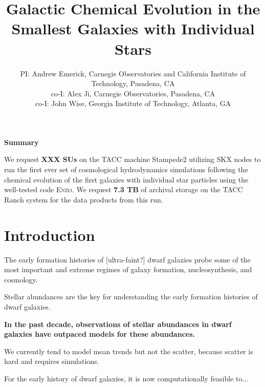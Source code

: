 \documentclass[12pt]{article} %
\title{\vspace{-5ex} \Large Galactic Chemical Evolution in the Smallest Galaxies with Individual Stars
       \vspace{-2ex}}
\author{\small PI: Andrew Emerick, Carnegie Observatories and California Institute of Technology, Pasadena, CA \\
\small co-I: Alex Ji, Carnegie Observatories, Pasadena, CA \\
\small co-I: John Wise, Georgia Institute of Technology, Atlanta, GA
}
\date{\vspace{-5ex}}
\begin{document}
 \thispagestyle{empty}


\maketitle

\begin{changemargin}{0.75cm}{0.75cm} 
\begin{center}\centering \textbf{Summary}\end{center}

We request \textbf{XXX SUs} on the TACC machine Stampede2 utilizing SKX nodes to run the first ever set of cosmological hydrodynamics simulations following the chemical evolution of the first galaxies with individual star particles using the well-tested code \textsc{Enzo}. We request \textbf{7.3 TB} of archival storage on the TACC Ranch system for the data products from this run.
\end{changemargin}

\section{Introduction}
The early formation histories of [ultra-faint?] dwarf galaxies probe some of the most important and extreme regimes of galaxy formation, nucleosynthesis, and cosmology.

Stellar abundances are the key for understanding the early formation histories of dwarf galaxies.

\textbf{In the past decade, observations of stellar abundances in dwarf galaxies have outpaced models for these abundances.}

We currently tend to model mean trends but not the scatter, because scatter is hard and requires simulations.

For the early history of dwarf galaxies, it is now computationally feasible to...
\end{document}
